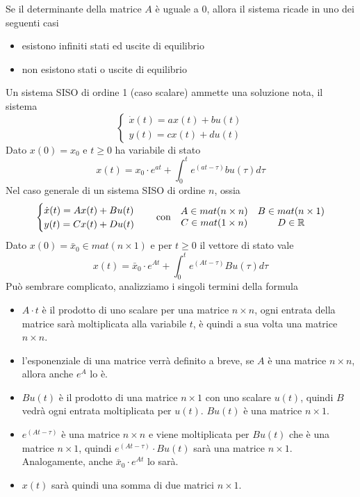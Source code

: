 \documentclass[10pt, letterpaper]{report}
\begin{document}
Se il determinante della matrice $A$ è uguale a 0, allora 
il sistema ricade in uno dei seguenti casi\begin{itemize}
    \item esistono infiniti stati ed uscite di equilibrio 
    \item non esistono stati o uscite di equilibrio
\end{itemize}
Un sistema SISO di ordine 1 (caso scalare) ammette 
una soluzione nota, il sistema
$$ \begin{cases}
    \dot{x}(t)=ax(t)+bu(t)\\ y(t)=cx(t)+du(t)
\end{cases}$$
Dato $x(0)=x_0$ e $t\ge 0$ 
ha variabile di stato 
$$ x(t)=x_0\cdot e^{at}+\int_0^te^{(at-\tau)}bu(\tau)d\tau$$
Nel caso generale di un sistema SISO di ordine $n$, ossia 
$$ \begin{cases}
    \dot{x}(t)=Ax(t)+Bu(t)\\ y(t)=Cx(t)+Du(t)
\end{cases} \ \ \text{ con }\ \ \begin{matrix}
    A\in mat(n\times n) & B\in mat(n\times 1)\\ 
    C\in mat(1\times n) &  D\in {\mathbb R}
\end{matrix}$$
Dato $x(0)=\bar x_0\in  mat(n\times 1)$ e per $t\ge 0$ il vettore 
di stato vale 
$$ x(t)=\bar x_0\cdot e^{At}+\int_0^te^{(At-\tau)}Bu(\tau)d\tau$$
Può sembrare complicato, analizziamo i singoli termini della formula\begin{itemize}
    \item $A\cdot t$ è il prodotto di uno scalare per una matrice $n\times n$, ogni entrata 
    della matrice sarà moltiplicata alla variabile $t$, è quindi a sua volta 
    una matrice $n\times n$. 
    \item l'esponenziale di una matrice verrà definito a breve, se $A$ è una 
    matrice $n\times n$, allora anche $e^A$ lo è.
    \item $Bu(t)$ è il prodotto di una matrice $n\times 1$ con uno 
    scalare $u(t)$, quindi $B$ vedrà ogni entrata moltiplicata per 
    $u(t)$. $Bu(t)$ è una matrice $n\times 1$.
    \item $e^{(At-\tau)}$ è una matrice $n\times n$ e viene moltiplicata per 
     $Bu(t)$ che è una matrice  $n\times 1$, quindi
      $e^{(At-\tau)}\cdot Bu(t)$ sarà una matrice $n\times 1$. Analogamente, 
      anche $\bar x_0\cdot e^{At}$ lo sarà. 
      \item $x(t)$ sarà quindi una somma di due matrici $n\times 1$.
\end{itemize}
\end{document}

